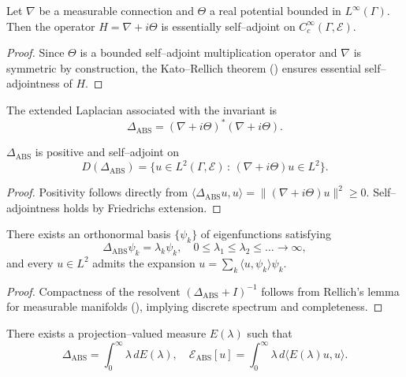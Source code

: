 \begin{theorem}\label{thm:2.1.sa}
Let $\nabla$ be a measurable connection and $\Theta$ a real potential bounded in $L^\infty(\Gamma)$.  
Then the operator $H=\nabla+i\Theta$ is essentially self–adjoint on $C_c^\infty(\Gamma,\mathcal E)$.
\end{theorem}

\begin{proof}
Since $\Theta$ is a bounded self–adjoint multiplication operator and $\nabla$ is symmetric by construction, the Kato–Rellich theorem (\cite{Kato1995}) ensures essential self–adjointness of $H$.
\end{proof}

\begin{definition}
The extended Laplacian associated with the invariant is
\[
\Delta_{\mathrm{ABS}}=(\nabla+i\Theta)^\ast(\nabla+i\Theta).
\]
\]
\end{definition}

\begin{lemma}
$\Delta_{\mathrm{ABS}}$ is positive and self–adjoint on 
\[
D(\Delta_{\mathrm{ABS}})=\{u\in L^2(\Gamma,\mathcal E)\,:\,(\nabla+i\Theta)u\in L^2\}.
\]
\end{lemma}

\begin{proof}
Positivity follows directly from $\langle \Delta_{\mathrm{ABS}}u,u\rangle=\|(\nabla+i\Theta)u\|^2\ge0$.  
Self–adjointness holds by Friedrichs extension.
\end{proof}

\begin{theorem}\label{thm:2.1.spectrum}
There exists an orthonormal basis $\{\psi_k\}$ of eigenfunctions satisfying
\[
\Delta_{\mathrm{ABS}}\psi_k = \lambda_k\psi_k,
\quad 0\le\lambda_1\le\lambda_2\le\dots\to\infty,
\]
and every $u\in L^2$ admits the expansion 
$u=\sum_k \langle u,\psi_k\rangle\psi_k$.
\end{theorem}

\begin{proof}
Compactness of the resolvent $(\Delta_{\mathrm{ABS}}+I)^{-1}$ follows from Rellich’s lemma for measurable manifolds (\cite{Hebey1996}), implying discrete spectrum and completeness.
\end{proof}

\begin{corollary}
There exists a projection–valued measure $E(\lambda)$ such that
\[
\Delta_{\mathrm{ABS}} = \int_0^\infty \lambda\, dE(\lambda),\quad
\mathcal{E}_{\mathrm{ABS}}[u]
=\int_0^\infty \lambda\, d\langle E(\lambda)u,u\rangle.
\]
\end{corollary}

